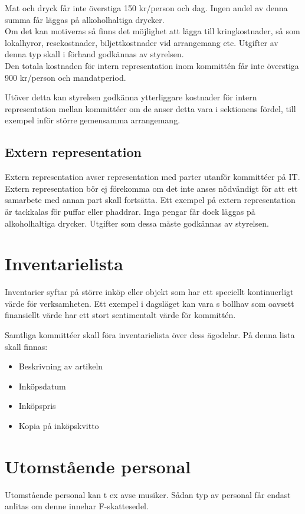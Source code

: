 \documentclass[11pt, includeaddress]{classes/cthit}
\begin{document}
Mat och dryck får inte överstiga 150 kr/person och dag. Ingen andel av denna summa får läggas på alkoholhaltiga drycker. \\

Om det kan motiveras så finns det möjlighet att lägga till kringkostnader, så som lokalhyror, resekostnader, biljettkostnader vid arrangemang etc. Utgifter av denna typ skall i förhand godkännas av styrelsen. \\

Den totala kostnaden för intern representation inom kommittén får inte överstiga 900 kr/person och mandatperiod. 

Utöver detta kan styrelsen godkänna ytterliggare kostnader för intern representation mellan kommittéer om de anser detta vara i sektionens fördel, till exempel inför större gemensamma arrangemang.

\subsection{Extern representation}
Extern representation avser representation med parter utanför kommittéer på IT. Extern representation bör ej förekomma om det inte anses nödvändigt för att ett samarbete med annan part skall fortsätta. Ett exempel på extern representation är tackkalas för puffar eller phaddrar. Inga pengar får dock läggas på alkoholhaltiga drycker. Utgifter som dessa måste godkännas av styrelsen.


\section{Inventarielista}
Inventarier syftar på större inköp eller objekt som har ett speciellt kontinuerligt värde för verksamheten. Ett exempel i dagsläget kan vara \NOLLKIT{}s bollhav som oavsett finansiellt värde har ett stort sentimentalt värde för kommittén.

Samtliga kommittéer skall föra inventarielista över dess ägodelar. På denna lista skall finnas:

\begin{itemize}
	\item Beskrivning av artikeln
	\item Inköpsdatum
	\item Inköpspris
	\item Kopia på inköpskvitto
\end{itemize}


\section{Utomstående personal}
Utomstående personal kan t ex avse musiker. Sådan typ av personal får endast anlitas om denne innehar F-skattesedel.
\end{document}

